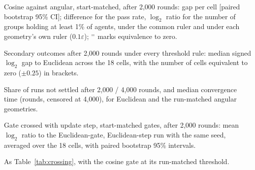 \documentclass[11pt]{article}
\begin{document}
\begin{table}[h]
\centering\scriptsize
\caption{Cosine against angular, start-matched, after 2{,}000 rounds: gap per cell [paired bootstrap 95\% CI]; difference for the pass rate, $\log_2$ ratio for the number of groups holding at least 1\% of agents, under the common ruler and under each geometry's own ruler ($0.1\varepsilon$); $^{=}$ marks equivalence to zero.}
\label{tab:cos-ang}

\end{table}

\begin{table}[h]
\centering\scriptsize
\caption{Secondary outcomes after 2{,}000 rounds under every threshold rule: median signed $\log_2$ gap to Euclidean across the 18 cells, with the number of cells equivalent to zero ($\pm0.25$) in brackets.}
\label{tab:secondary}

\end{table}

\begin{table}[h]
\centering\scriptsize
\caption{Share of runs not settled after 2{,}000 / 4{,}000 rounds, and median convergence time (rounds, censored at 4{,}000), for Euclidean and the run-matched angular geometries.}
\label{tab:settled}

\end{table}

\begin{table}[h]
\centering\small
\caption{Gate crossed with update step, start-matched gates, after 2{,}000 rounds: mean $\log_2$ ratio to the Euclidean-gate, Euclidean-step run with the same seed, averaged over the 18 cells, with paired bootstrap 95\% intervals.}
\label{tab:crossing}

\end{table}

\begin{table}[h]
\centering\small
\caption{As Table~\ref{tab:crossing}, with the cosine gate at its run-matched threshold.}
\label{tab:crossing-run}

\end{table}
\end{document}
